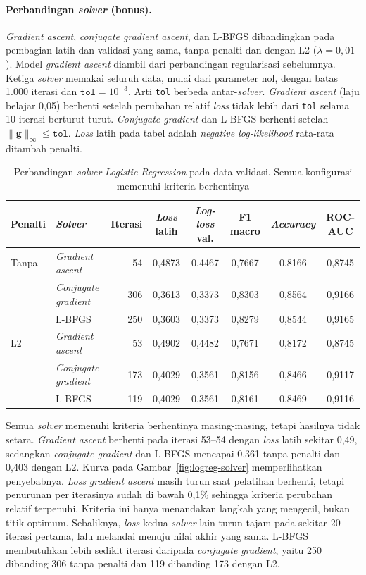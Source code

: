 \paragraph{Perbandingan \textit{solver} (bonus).}
\textit{Gradient ascent}, \textit{conjugate gradient ascent}, dan L-BFGS
dibandingkan pada pembagian latih dan validasi yang sama, tanpa penalti dan
dengan L2 ($\lambda=0{,}01$). Model \textit{gradient ascent} diambil dari
perbandingan regularisasi sebelumnya. Ketiga \textit{solver} memakai
seluruh data, mulai dari parameter nol, dengan batas 1.000 iterasi dan
$\texttt{tol}=10^{-3}$. Arti \texttt{tol} berbeda antar-\textit{solver}.
\textit{Gradient ascent} (laju belajar 0,05) berhenti setelah perubahan
relatif \textit{loss} tidak lebih dari \texttt{tol} selama 10 iterasi
berturut-turut. \textit{Conjugate gradient} dan L-BFGS berhenti setelah
$\lVert\mathbf{g}\rVert_\infty\le\texttt{tol}$. \textit{Loss} latih pada
tabel adalah \textit{negative log-likelihood} rata-rata ditambah penalti.

\begin{table}[H]
\centering
\footnotesize
\caption{Perbandingan \textit{solver} \textit{Logistic Regression} pada data validasi. Semua konfigurasi memenuhi kriteria berhentinya}
\label{tab:logreg-solver}
\setlength{\tabcolsep}{4pt}
\begin{tabular}{@{}llrccccc@{}}
\toprule
Penalti & \textit{Solver} & Iterasi & \textit{Loss} latih & \textit{Log-loss} val. & F1 macro & \textit{Accuracy} & ROC-AUC \\
\midrule
Tanpa & \textit{Gradient ascent} & 54 & 0,4873 & 0,4467 & 0,7667 & 0,8166 & 0,8745 \\
 & \textit{Conjugate gradient} & 306 & 0,3613 & 0,3373 & 0,8303 & 0,8564 & 0,9166 \\
 & L-BFGS & 250 & 0,3603 & 0,3373 & 0,8279 & 0,8544 & 0,9165 \\
\midrule
L2 & \textit{Gradient ascent} & 53 & 0,4902 & 0,4482 & 0,7671 & 0,8172 & 0,8745 \\
 & \textit{Conjugate gradient} & 173 & 0,4029 & 0,3561 & 0,8156 & 0,8466 & 0,9117 \\
 & L-BFGS & 119 & 0,4029 & 0,3561 & 0,8161 & 0,8469 & 0,9116 \\
\bottomrule
\end{tabular}
\end{table}

Semua \textit{solver} memenuhi kriteria berhentinya masing-masing, tetapi
hasilnya tidak setara. \textit{Gradient ascent} berhenti pada iterasi 53--54
dengan \textit{loss} latih sekitar 0,49, sedangkan \textit{conjugate
gradient} dan L-BFGS mencapai 0,361 tanpa penalti dan 0,403 dengan L2.
Kurva pada Gambar~\ref{fig:logreg-solver} memperlihatkan penyebabnya.
\textit{Loss} \textit{gradient ascent} masih turun saat pelatihan berhenti,
tetapi penurunan per iterasinya sudah di bawah 0,1\% sehingga kriteria
perubahan relatif terpenuhi. Kriteria ini hanya menandakan langkah yang
mengecil, bukan titik optimum. Sebaliknya, \textit{loss} kedua \textit{solver}
lain turun tajam pada sekitar 20 iterasi pertama, lalu melandai menuju nilai
akhir yang sama. L-BFGS membutuhkan lebih sedikit iterasi daripada
\textit{conjugate gradient}, yaitu 250 dibanding 306 tanpa penalti dan 119
dibanding 173 dengan L2.


